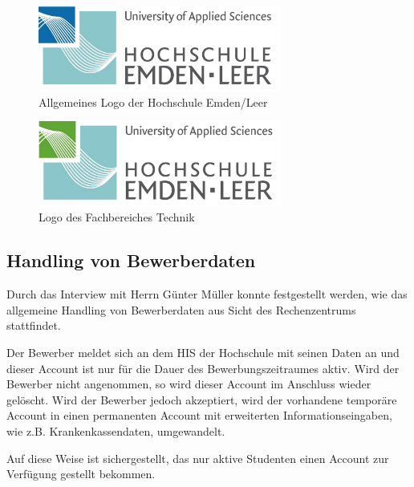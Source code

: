 \begin{figure}[h!]
	\centering
	\includegraphics[width=8cm]{kapitel/gruppe2/bilder/hs_logo_allgemein}
	\caption{Allgemeines Logo der Hochschule Emden/Leer}
	\label{fig_logo_allgemein}
\end{figure}

\begin{figure}[h!]
	\centering
	\includegraphics[width=8cm]{kapitel/gruppe2/bilder/hs_logo_technik}
	\caption{Logo des Fachbereiches Technik}
	\label{fig_logo_fb_technik}
\end{figure}

\subsection{Handling von Bewerberdaten}
Durch das Interview mit Herrn Günter Müller konnte festgestellt werden, wie das allgemeine Handling von Bewerberdaten aus Sicht des Rechenzentrums stattfindet.
 
Der Bewerber meldet sich an dem HIS der Hochschule mit seinen Daten an und dieser Account ist nur für die Dauer des Bewerbungszeitraumes aktiv. Wird der Bewerber nicht angenommen, so wird dieser Account im Anschluss wieder gelöscht. Wird der Bewerber jedoch akzeptiert, wird der vorhandene temporäre Account in einen permanenten Account mit erweiterten Informationseingaben, wie z.B. Krankenkassendaten, umgewandelt. 

Auf diese Weise ist sichergestellt, das nur aktive Studenten einen Account zur Verfügung gestellt bekommen.